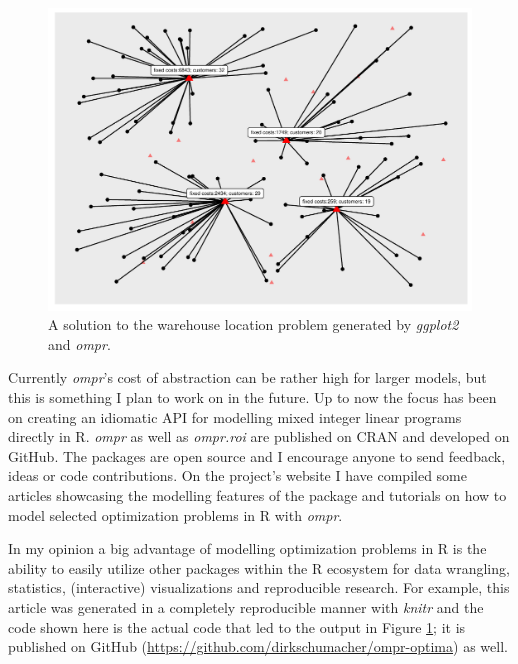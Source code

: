 \documentclass{optima}\usepackage[]{graphicx}\usepackage[]{color}
\makeatletter
\def\maxwidth{ %
  \ifdim\Gin@nat@width>\linewidth
    \linewidth
  \else
    \Gin@nat@width
  \fi
}
\newenvironment{knitrout}{}{} %
\makeatother
\begin{document}
\begin{figure}[h]
\begin{knitrout}
\color{fgcolor}

{\centering \includegraphics[width=\maxwidth]{figure/optima-figure-1} 

}



\end{knitrout}
\caption{A solution to the warehouse location problem generated by \emph{ggplot2} and \emph{ompr}.}
\label{fig:ompr_fig_warehouse}
\end{figure}

Currently \emph{ompr}'s cost of abstraction can be rather high for larger models, but this is something I plan to work on in the future. Up to now the focus has been on creating an idiomatic API for modelling mixed integer linear programs directly in R. \emph{ompr} as well as \emph{ompr.roi} are published on CRAN and developed on GitHub. The packages are open source and I encourage anyone to send feedback, ideas or code contributions. On the project's website \cite{ompr} I have compiled some articles showcasing the modelling features of the package and tutorials on how to model selected optimization problems in R with \emph{ompr}.

In my opinion a big advantage of modelling optimization problems in R is the ability to easily utilize other packages within the R ecosystem for data wrangling, statistics, (interactive) visualizations and reproducible research. For example, this article was generated in a completely reproducible manner with \emph{knitr} \cite{knitr} and the code shown here is the actual code that led to the output in Figure \ref{fig:ompr_fig_warehouse}; it is published on GitHub (\url{https://github.com/dirkschumacher/ompr-optima}) as well.
\end{document}
